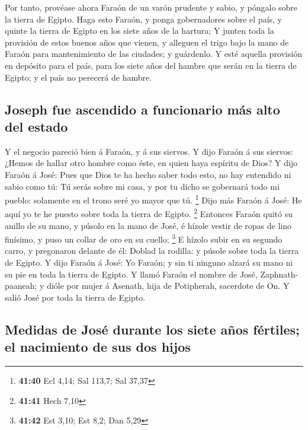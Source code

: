  Por tanto, provéase ahora Faraón de un varón prudente y
sabio, y póngalo sobre la tierra de Egipto.  Haga esto
Faraón, y ponga gobernadores sobre el país, y quinte la tierra de Egipto
en los siete años de la hartura;  Y junten toda la
provisión de estos buenos años que vienen, y alleguen el trigo bajo la
mano de Faraón para mantenimiento de las ciudades; y guárdenlo.
 Y esté aquella provisión en depósito para el país, para
los siete años del hambre que serán en la tierra de Egipto; y el país no
perecerá de hambre.

\hypertarget{joseph-fue-ascendido-a-funcionario-muxe1s-alto-del-estado}{%
\subsection{Joseph fue ascendido a funcionario más alto del
estado}\label{joseph-fue-ascendido-a-funcionario-muxe1s-alto-del-estado}}

 Y el negocio pareció bien á Faraón, y á sus siervos.
 Y dijo Faraón á sus siervos: ¿Hemos de hallar otro hombre
como éste, en quien haya espíritu de Dios?  Y dijo Faraón á
José: Pues que Dios te ha hecho saber todo esto, no hay entendido ni
sabio como tú:  Tú serás sobre mi casa, y por tu dicho se
gobernará todo mi pueblo: solamente en el trono seré yo mayor que tú.
\footnote{\textbf{41:40} Ecl 4,14; Sal 113,7; Sal 37,37} 
Dijo más Faraón á José: He aquí yo te he puesto sobre toda la tierra de
Egipto. \footnote{\textbf{41:41} Hech 7,10}  Entonces
Faraón quitó su anillo de su mano, y púsolo en la mano de José, é hízole
vestir de ropas de lino finísimo, y puso un collar de oro en su cuello;
\footnote{\textbf{41:42} Est 3,10; Est 8,2; Dan 5,29}  E
hízolo subir en su segundo carro, y pregonaron delante de él: Doblad la
rodilla: y púsole sobre toda la tierra de Egipto.  Y dijo
Faraón á José: Yo Faraón; y sin ti ninguno alzará su mano ni su pie en
toda la tierra de Egipto.  Y llamó Faraón el nombre de
José, Zaphnath-paaneah; y dióle por mujer á Asenath, hija de Potipherah,
sacerdote de On. Y salió José por toda la tierra de Egipto.

\hypertarget{medidas-de-josuxe9-durante-los-siete-auxf1os-fuxe9rtiles-el-nacimiento-de-sus-dos-hijos}{%
\subsection{Medidas de José durante los siete años fértiles; el
nacimiento de sus dos
hijos}\label{medidas-de-josuxe9-durante-los-siete-auxf1os-fuxe9rtiles-el-nacimiento-de-sus-dos-hijos}}

